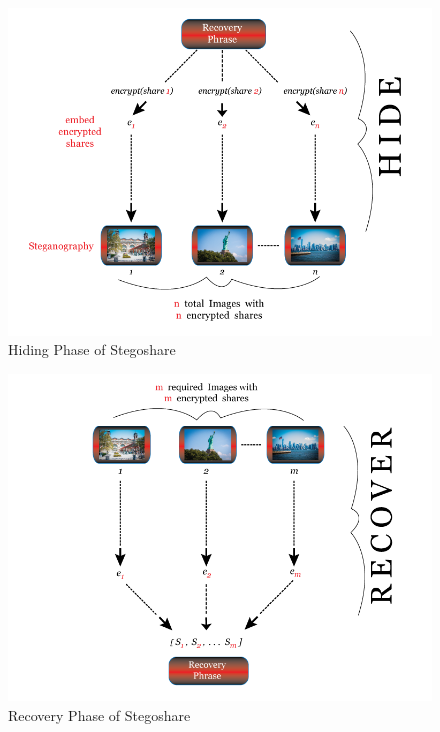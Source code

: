 \begin{figure}[H]
	\centering
  \includegraphics[scale = 0.35]{hide_slide-3.png}
	\caption{Hiding Phase of Stegoshare}
	\label{fig: Hiding Phas}
\end{figure}

\begin{figure}[H]
	\centering
  \includegraphics[scale = 0.35]{recover_slide-3.png}
	\caption{Recovery Phase of Stegoshare}
	\label{fig: Recovery Phas}
\end{figure}
